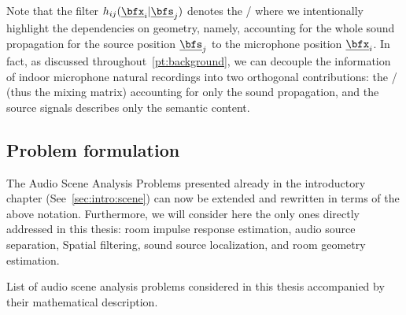 Note that the filter $\flt_{\idxMicSrc}(\positionMicrophone_{\idxMic} | \positionSource_{\idxSrc})$ denotes the \RIR/ where we intentionally highlight the dependencies on geometry,
namely, accounting for the whole sound propagation for the source position $\positionSource_{\idxSrc}$ to the microphone position $\positionMicrophone_{\idxMic}$.
In fact, as discussed throughout~\cref{pt:background}, we can decouple the information of indoor microphone natural recordings into two orthogonal contributions:
the \RIRs/ (thus the mixing matrix) accounting for only the sound propagation, and the source signals describes only the semantic content.

\newcommand{\setMicSignals}{\ensuremath{\set{\mic_{\idxMic}}_\idxMic}}
\newcommand{\setSrcSignals}{\ensuremath{\set{\src_{\idxSrc}}_\idxSrc}}
\newcommand{\setSrcPositions}{\ensuremath{\set{\positionSource_{\idxSrc}}_\idxSrc}}
\newcommand{\setFltSignals}{\ensuremath{\set{\flt_{\idxMicSrc}(\positionMicrophone_{\idxMic} | \positionSource_{\idxSrc})}_{\idxMicSrc}}}


\subsection{Problem formulation}
The Audio Scene Analysis Problems presented already in the introductory chapter (See~\cref{sec:intro:scene}) can now be extended and rewritten in terms of the above notation.
Furthermore, we will consider here the only ones directly addressed in this thesis: room impulse response estimation, audio source separation, Spatial filtering, sound source localization, and room geometry estimation.

\begin{table}[!h]

    \begin{fullwidth}
    \centering
    \small
    \renewcommand{\arraystretch}{1.3}

    
    \caption{List of audio scene analysis problems considered in this thesis accompanied by their mathematical description.}
    \label{tab:application:problems}

    \end{fullwidth}

\end{table}

